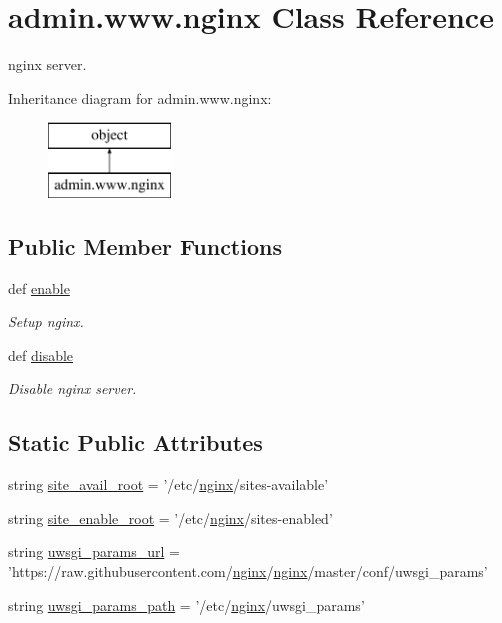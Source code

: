 \hypertarget{classadmin_1_1www_1_1nginx}{\section{admin.\-www.\-nginx Class Reference}
\label{classadmin_1_1www_1_1nginx}
}


nginx server.  


Inheritance diagram for admin.\-www.\-nginx\-:\begin{figure}[H]
\begin{center}
\leavevmode
\includegraphics[height=2.000000cm]{dc/db8/classadmin_1_1www_1_1nginx}
\end{center}
\end{figure}
\subsection*{Public Member Functions}
\begin{DoxyCompactItemize}
\item 
def \hyperlink{classadmin_1_1www_1_1nginx_a6d55a9d2645ebdd32a86f07caa30e54f}{enable}
\begin{DoxyCompactList}\small\item\em Setup nginx. \end{DoxyCompactList}\item 
def \hyperlink{classadmin_1_1www_1_1nginx_a97b2603a64e0758b3d548bc1971dcc4e}{disable}
\begin{DoxyCompactList}\small\item\em Disable nginx server. \end{DoxyCompactList}\end{DoxyCompactItemize}
\subsection*{Static Public Attributes}
\begin{DoxyCompactItemize}
\item 
string \hyperlink{classadmin_1_1www_1_1nginx_a0345aad76d9ddd6469c13bef207a9766}{site\-\_\-avail\-\_\-root} = '/etc/\hyperlink{classadmin_1_1www_1_1nginx}{nginx}/sites-\/available'
\item 
string \hyperlink{classadmin_1_1www_1_1nginx_a3e1b0fbd45f31aaeacb6baaec80806ce}{site\-\_\-enable\-\_\-root} = '/etc/\hyperlink{classadmin_1_1www_1_1nginx}{nginx}/sites-\/enabled'
\item 
string \hyperlink{classadmin_1_1www_1_1nginx_aec1e7959ddfe6598718fb6c8c9d72320}{uwsgi\-\_\-params\-\_\-url} = 'https\-://raw.\-githubusercontent.\-com/\hyperlink{classadmin_1_1www_1_1nginx}{nginx}/\hyperlink{classadmin_1_1www_1_1nginx}{nginx}/master/conf/uwsgi\-\_\-params'
\item 
string \hyperlink{classadmin_1_1www_1_1nginx_afd444548cd6faf42c56e24e22148a4b4}{uwsgi\-\_\-params\-\_\-path} = '/etc/\hyperlink{classadmin_1_1www_1_1nginx}{nginx}/uwsgi\-\_\-params'
\end{DoxyCompactItemize}
